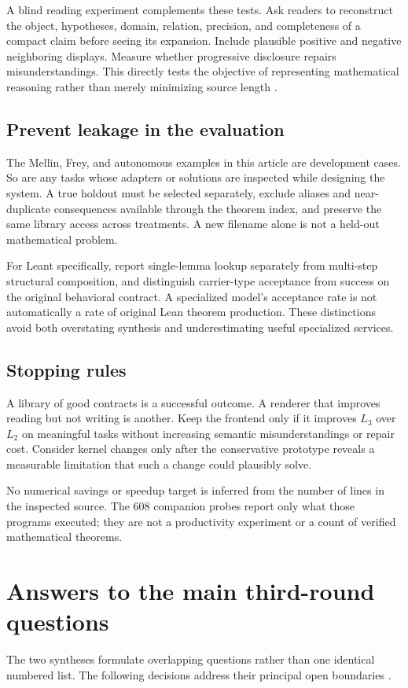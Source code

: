 \documentclass[11pt,a4paper]{article}
\theoremstyle{plain}\newtheorem{proposition}{Proposition}[section]
\theoremstyle{definition}\newtheorem{definition}[proposition]{Definition}
\theoremstyle{remark}\newtheorem{remark}[proposition]{Remark}
\begin{document}
A blind reading experiment complements these tests. Ask readers to reconstruct the object, hypotheses, domain, relation, precision, and completeness of a compact claim before seeing its expansion. Include plausible positive and negative neighboring displays. Measure whether progressive disclosure repairs misunderstandings. This directly tests the objective of representing mathematical reasoning rather than merely minimizing source length \cite{synA}.

\subsection{Prevent leakage in the evaluation}
The Mellin, Frey, and autonomous examples in this article are development cases. So are any tasks whose adapters or solutions are inspected while designing the system. A true holdout must be selected separately, exclude aliases and near-duplicate consequences available through the theorem index, and preserve the same library access across treatments. A new filename alone is not a held-out mathematical problem.

For Leant specifically, report single-lemma lookup separately from multi-step structural composition, and distinguish carrier-type acceptance from success on the original behavioral contract. A specialized model's acceptance rate is not automatically a rate of original Lean theorem production. These distinctions avoid both overstating synthesis and underestimating useful specialized services.

\subsection{Stopping rules}
A library of good contracts is a successful outcome. A renderer that improves reading but not writing is another. Keep the frontend only if it improves \(L_3\) over \(L_2\) on meaningful tasks without increasing semantic misunderstandings or repair cost. Consider kernel changes only after the conservative prototype reveals a measurable limitation that such a change could plausibly solve.

No numerical savings or speedup target is inferred from the number of lines in the inspected source. The 608 companion probes report only what those programs executed; they are not a productivity experiment or a count of verified mathematical theorems.

\section{Answers to the main third-round questions}
The two syntheses formulate overlapping questions rather than one identical numbered list. The following decisions address their principal open boundaries \cite{synA,synB}.
\end{document}

